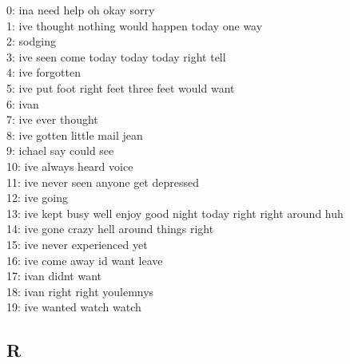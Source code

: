 \documentclass[a4paper]{article}
\begin{document}
\begin{center}
    0:  ina need help oh okay sorry\\
    1:  ive thought nothing would happen today one way\\
    2:    sodging\\
    3:  ive seen come today today today right tell\\
    4:  ive forgotten\\
    5:  ive put foot right feet three feet would want\\
    6:  ivan\\
    7:  ive ever thought\\
    8:  ive gotten little mail jean\\
    9:  ichael say could see\\
    10:  ive always heard voice\\
    11:  ive never seen anyone get depressed\\
    12:  ive going\\
    13:  ive kept busy well enjoy good night today right right around huh\\
    14:  ive gone crazy hell around things right\\
    15:  ive never experienced yet\\
    16:  ive come away id want leave\\
    17:  ivan didnt want\\
    18:  ivan right right youlemnys\\
    19:  ive wanted watch watch\\
\end{center}

\subsection*{R}
\end{document}
